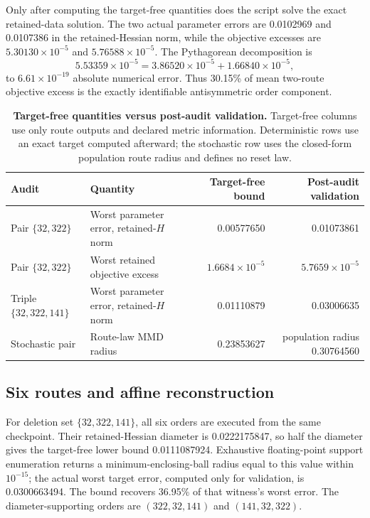 \documentclass[10pt]{article}
\theoremstyle{definition}
\theoremstyle{remark}
\begin{document}
Only after computing the target-free quantities does the script solve the
exact retained-data solution. The two actual
parameter errors are 0.0102969 and 0.0107386 in the retained-Hessian norm,
while the objective excesses are \(5.30130\times10^{-5}\) and
\(5.76588\times10^{-5}\). The Pythagorean decomposition is
\[
5.53359\times10^{-5}
=3.86520\times10^{-5}+1.66840\times10^{-5},
\]
to \(6.61\times10^{-19}\) absolute numerical error. Thus 30.15\% of mean
two-route objective excess is the exactly identifiable antisymmetric order
component.

\begin{table}[t]
\centering
\caption{\textbf{Target-free quantities versus post-audit validation.}
Target-free columns use only route outputs and declared metric information.
Deterministic rows use an exact target computed afterward; the stochastic row
uses the closed-form population route radius and defines no reset law.}
\label{tab:case}
\small
\begin{tabularx}{\textwidth}{@{}l>{\raggedright\arraybackslash}Xrr@{}}
\toprule
Audit & Quantity & Target-free bound & Post-audit validation\\
\midrule
Pair \(\{32,322\}\) &
Worst parameter error, retained-\(H\) norm &
0.00577650 & 0.01073861\\
Pair \(\{32,322\}\) &
Worst retained objective excess &
\(1.6684\times10^{-5}\) & \(5.7659\times10^{-5}\)\\
Triple \(\{32,322,141\}\) &
Worst parameter error, retained-\(H\) norm &
0.01110879 & 0.03006635\\
Stochastic pair &
Route-law MMD radius &
0.23853627 & population radius 0.30764560\\
\bottomrule
\end{tabularx}
\end{table}

\subsection{Six routes and affine reconstruction}

For deletion set \(\{32,322,141\}\), all six orders are executed from the same
checkpoint. Their retained-Hessian diameter is 0.0222175847, so half the
diameter gives the target-free lower bound 0.0111087924. Exhaustive
floating-point support enumeration returns a minimum-enclosing-ball radius
equal to this value within \(10^{-15}\); the actual worst target error,
computed only for validation, is 0.0300663494. The bound recovers 36.95\% of
that witness's worst error. The diameter-supporting orders are
\((322,32,141)\) and \((141,32,322)\).
\end{document}
